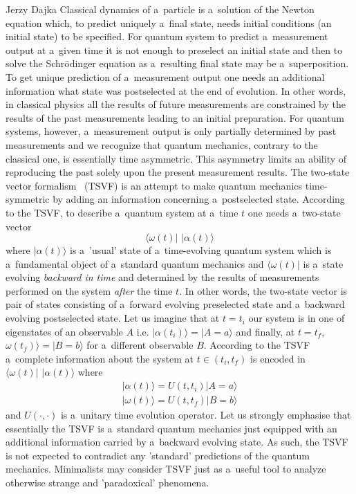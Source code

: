 \begin{artengenv}{Jerzy Dajka}
Classical dynamics of a~particle is a~solution of the Newton equation which, to predict uniquely a~final state, needs initial conditions (an initial state) to be specified. For quantum system to predict a~measurement output at a~given time it is not enough to preselect an initial state and then to solve the Schr\"{o}dinger equation as a~resulting final state may be a~superposition. To get unique prediction of a~measurement output one needs an additional information what state was postselected at the end of evolution.  In other words, in classical physics all the results of future measurements are constrained by the results of the past measurements leading to an initial preparation. For quantum systems, however, a~measurement output is only partially determined by past measurements and we recognize that quantum mechanics, contrary to the classical one, is essentially time asymmetric. This asymmetry limits an ability of reproducing the  past solely upon the present measurement results. The two-state vector formalism~\parencite{Aharonov2008} (TSVF) is an attempt to make quantum mechanics time-symmetric by adding an information concerning a~postselected state. According to the TSVF, to describe a~quantum system at a~time $t$ one needs a~two-state vector
\begin{equation}\label{tsv}
    \langle \omega(t)|\,\,|\alpha(t)\rangle
\end{equation}
where $|\alpha(t)\rangle$ is a~'usual' state of a~time-evolving quantum system which is a~fundamental object of a~standard quantum mechanics and $\langle\omega(t)|$ is a~state evolving {\it backward in time} and  determined by the results of measurements performed on the system {\it after} the time $t$. In other words, the two-state vector is pair of states consisting of   a~forward evolving preselected state  and a~backward evolving postselected state. 
Let us imagine that at $t=t_i$ our system is in one of eigenstates of an observable $A$ i.e. $|\alpha(t_i)\rangle=|A=a\rangle$ and finally, at $t=t_f$, $\omega(t_f)\rangle=|B=b\rangle$ for a~different observable $B$. According to the TSVF a~complete information about the system at $t\in(t_i,t_f)$ is encoded in $\langle \omega(t)|\,\,|\alpha(t)\rangle$ where
\begin{equation}
   \begin{split}
       |\alpha(t)\rangle = U(t,t_i)|A=a\rangle\\
       |\omega(t)\rangle= U(t,t_f)|B=b\rangle
   \end{split}
\end{equation}
and $U(\cdot,\cdot)$ is a~unitary time evolution operator. 
Let us strongly emphasise that essentially the TSVF is a~standard quantum mechanics just equipped with an additional information carried by a~backward evolving state. As such, the TSVF is not expected to contradict any 'standard' predictions of the quantum mechanics.  Minimalists may consider TSVF just as a~useful tool to analyze otherwise strange and 'paradoxical' phenomena.   



\end{artengenv}
